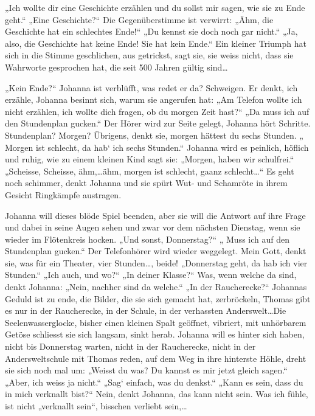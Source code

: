 \documentclass[10pt,a5paper]{book}
\begin{document}
„Ich wollte dir eine Geschichte erzählen und du sollst mir sagen, wie sie zu Ende geht.“ „Eine Geschichte?“ Die Gegenüberstimme ist verwirrt: „Ähm, die Geschichte hat ein schlechtes Ende!“ „Du kennst sie doch noch gar nicht.“ „Ja, also, die Geschichte hat keine Ende! Sie hat kein Ende.“ Ein kleiner Triumph hat sich in die Stimme geschlichen, aus getrickst, sagt sie, sie weiss nicht, dass sie Wahrworte gesprochen hat, die seit 500 Jahren gültig sind\dots 

„Kein Ende?“ Johanna ist verblüfft, was redet er da? Schweigen.
Er denkt, ich erzähle, Johanna besinnt sich, warum sie angerufen hat: „Am Telefon wollte ich nicht erzählen, ich wollte dich fragen, ob du morgen Zeit hast?“ „Da muss ich auf den Stundenplan gucken.“ Der Hörer wird zur Seite gelegt, Johanna hört Schritte. Stundenplan? Morgen? Übrigens, denkt sie, morgen hättest du sechs Stunden. „ Morgen ist schlecht, da hab` ich sechs Stunden.“ Johanna wird es peinlich, höflich und ruhig, wie zu einem kleinen Kind sagt sie: „Morgen, haben wir schulfrei.“ „Scheisse, Scheisse, ähm,\dots ähm, morgen ist schlecht, gaanz schlecht\dots “ Es geht noch schimmer, denkt Johanna und sie spürt Wut- und Schamröte in ihrem Gesicht Ringkämpfe austragen.

Johanna will dieses blöde Spiel beenden, aber sie will die Antwort auf ihre Frage und dabei in seine Augen sehen und zwar vor dem nächsten Dienstag, wenn sie wieder im Flötenkreis hocken. „Und sonst, Donnerstag?“ „ Muss ich auf den Stundenplan gucken.“ Der Telefonhörer wird wieder weggelegt. Mein Gott, denkt sie, was für ein Theater, vier Stunden\dots , beide! „Donnerstag geht, da hab ich vier Stunden.“ „Ich auch, und wo?“ „In deiner Klasse?“ Was, wenn welche da sind, denkt Johanna: „Nein, nachher sind da welche.“ „In der Raucherecke?“ Johannas Geduld ist zu ende, die Bilder, die sie sich gemacht hat, zerbröckeln, Thomas gibt es nur in der Raucherecke, in der Schule, in der verhassten Anderswelt\dots  Die Seelenwasserglocke, bisher einen kleinen Spalt geöffnet, vibriert, mit unhörbarem Getöse schliesst sie sich langsam, sinkt herab. Johanna will es hinter sich haben, nicht bis Donnerstag warten, nicht in der Raucherecke, nicht in der Andersweltschule mit Thomas reden, auf dem Weg in ihre hinterste Höhle, dreht sie sich noch mal um: „Weisst du was? Du kannst es mir jetzt gleich sagen.“ „Aber, ich weiss ja nicht.“ „Sag` einfach, was du denkst.“ „Kann es sein, dass du in mich verknallt bist?“ Nein, denkt Johanna, das kann nicht sein. Was ich fühle, ist nicht „verknallt sein“, bisschen verliebt sein,\dots 
\end{document}
